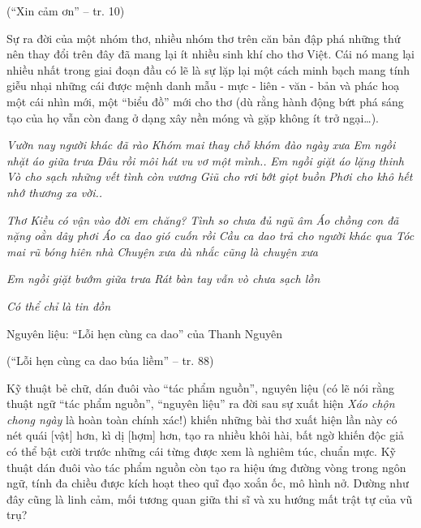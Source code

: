 \documentclass[../main.tex]{subfiles}
\begin{document}
\begin{multicols}{2}
\begin{blockquote}
(“Xin cảm ơn” – tr. 10) 

\end{blockquote}


Sự ra đời của một nhóm thơ, nhiều nhóm thơ trên căn bản đập phá những thứ nên thay đổi trên đây đã mang lại ít nhiều sinh khí cho thơ Việt. Cái nó mang lại nhiều nhất trong giai đoạn đầu có lẽ là sự lặp lại một cách minh bạch mang tính giễu nhại những cái được mệnh danh mẫu - mực - liên - văn - bản và phác hoạ một cái nhìn mới, một “biểu đồ” mới cho thơ (dù rằng hành động bứt phá sáng tạo của họ vẫn còn đang ở dạng xây nền móng và gặp không ít trở ngại…). 
\begin{blockquote}


\textit{Vườn nay người khác đã rào} 
\textit{Khóm mai thay chỗ khóm đào ngày xưa} 
\textit{Em ngồi nhặt áo giữa trưa} 
\textit{Đâu rồi môi hát vu vơ một mình..} 
\textit{Em ngồi giặt áo lặng thinh} 
\textit{Vò cho sạch những vết tình còn vương} 
\textit{Giũ cho rơi bớt giọt buồn} 
\textit{Phơi cho khô hết nhớ thương xa vời..} 

\textit{Thơ Kiều có vận vào đời em chăng?} 
\textit{Tình so chưa đủ ngũ âm} 
\textit{Áo chồng con đã nặng oằn dây phơi} 
\textit{Áo ca dao gió cuốn rồi} 
\textit{Cầu ca dao trả cho người khác qua} 
\textit{Tóc mai rũ bóng hiên nhà} 
\textit{Chuyện xưa dù nhắc cũng là chuyện xưa} 

\textit{Em ngồi giặt bướm giữa trưa} 
\textit{Rát bàn tay vẫn vò chưa sạch lồn} 

\textit{Có thể chỉ là tin đồn} 

Nguyên liệu: “Lỗi hẹn cùng ca dao” của Thanh Nguyên 

(“Lỗi hẹn cùng ca dao búa liềm” – tr. 88) 

\end{blockquote}


Kỹ thuật bẻ chữ, dán đuôi vào “tác phẩm nguồn”, nguyên liệu (có lẽ nói rằng thuật ngữ “tác phẩm nguồn”, “nguyên liệu” ra đời sau sự xuất hiện \textit{Xáo chộn chong ngày} là hoàn toàn chính xác!) khiến những bài thơ xuất hiện lần này có nét quái [vật] hơn, kì dị [hợm] hơn, tạo ra nhiều khôi hài, bất ngờ khiến độc giả có thể bật cười trước những cái từng được xem là nghiêm túc, chuẩn mực. Kỹ thuật dán đuôi vào tác phẩm nguồn còn tạo ra hiệu ứng đường vòng trong ngôn ngữ, tính đa chiều được kích hoạt theo quĩ đạo xoắn ốc, mô hình nở. Dường như đây cũng là linh cảm, mối tương quan giữa thi sĩ và xu hướng mất trật tự của vũ trụ? 
\begin{blockquote}



\end{blockquote}
\end{multicols}
\end{document}
